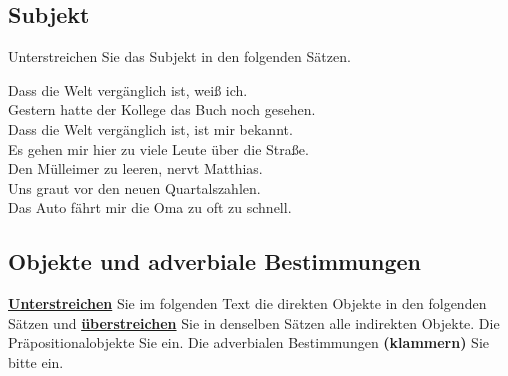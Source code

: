 \documentclass[12pt,a4paper,twoside]{article}
\newcommand{\rot}[1]{\textcolor{rot}{#1}}
\newcommand*{\mybox}[1]{\framebox{#1}}
\newcommand\ol[1]{{\setul{-0.9em}{}\ul{#1}}}
\newcommand{\syntaxaufgabe}{}
\newcommand{\FUBreak}{\clearpage}
\newcommand{\FUZeile}{\hspace{\baselineskip}}
\newcommand{\syntaxaufgabe}{\textbf{\rot{Syntax-Vorlesung}}\ |\ }
\newcommand{\FUBreak}{}
\newcommand{\FUZeile}{}
\begin{document}
\FUZeile

\subsection{\syntaxaufgabe Subjekt}

Unterstreichen Sie das Subjekt in den folgenden Sätzen.

\begin{exe}
  \setcounter{xnumi}{0}
  \ex Dass die Welt vergänglich ist, weiß ich.\\

  \ex Gestern hatte der Kollege das Buch noch gesehen.\\

  \ex Dass die Welt vergänglich ist, ist mir bekannt.\\

  \ex Es gehen mir hier zu viele Leute über die Straße.\\

  \ex Den Mülleimer zu leeren, nervt Matthias.\\

  \ex Uns graut vor den neuen Quartalszahlen.\\

  \ex Das Auto fährt mir die Oma zu oft zu schnell.\\

\end{exe}

\FUBreak

\subsection{\syntaxaufgabe Objekte und adverbiale Bestimmungen}

\textbf{\ul{Unterstreichen}} Sie im folgenden Text die direkten Objekte in den folgenden Sätzen und \textbf{\ol{überstreichen}} Sie in denselben Sätzen alle indirekten Objekte. Die Präpositionalobjekte \textbf{\mybox{rahmen}} Sie ein.
Die adverbialen Bestimmungen \textbf{(klammern)} Sie bitte ein.
\end{document}
